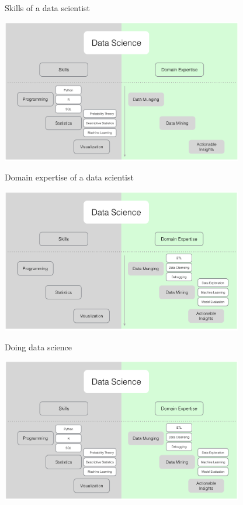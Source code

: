 \documentclass[10pt]{beamer}
\begin{document}
    \begin{frame}{Skills of a data scientist}
      \begin{center}
        \includegraphics[width=300pt]{graphs/data_science_skills}
      \end{center}
    \end{frame}


    \begin{frame}{Domain expertise of a data scientist}
      \begin{center}
        \includegraphics[width=300pt]{graphs/data_science_domain}
      \end{center}
    \end{frame}

    \begin{frame}{Doing data science}
      \begin{center}
        \includegraphics[width=300pt]{graphs/data_science_skills_domain}
      \end{center}
    \end{frame}
\end{document}
